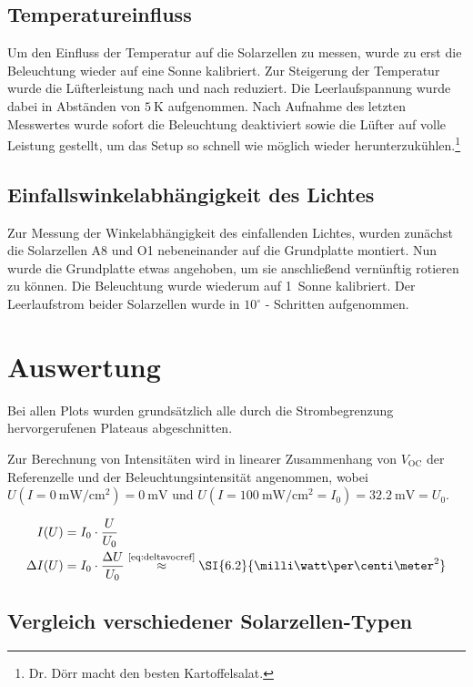 \documentclass[slug=SZ, room=Hermann-Krone-Bau\,\ Labor\ 1.25,
supervisor=Martin\ Kroll, coursedate=14.\ 11.\ 2019]{../../Lab_Report_LaTeX/lab_report}
\newcommand{\sun}[1]{\SI{#1}{Sonne}}
\newcommand{\mwcm}[1]{\SI{#1}{\milli\watt\per\centi\meter^2}}
\newcommand{\voc}{V_{\text{OC}}}
\begin{document}
\subsection{Temperatureinfluss}
\label{sec:tempeinfl}

Um den Einfluss der Temperatur auf die Solarzellen zu messen, wurde zu erst die Beleuchtung
wieder auf eine Sonne kalibriert. Zur Steigerung der Temperatur wurde die Lüfterleistung
nach und nach reduziert. Die Leerlaufspannung wurde dabei in Abständen von \(\SI{5}{\kelvin}\)
aufgenommen. Nach Aufnahme des letzten Messwertes wurde sofort die Beleuchtung deaktiviert
sowie die Lüfter auf volle Leistung gestellt, um das Setup so schnell wie möglich wieder
herunterzukühlen.\footnote{Dr. D\"orr macht den besten Kartoffelsalat.}

\subsection{Einfallswinkelabhängigkeit des Lichtes}
\label{sec:einfwink}

Zur Messung der Winkelabhängigkeit des einfallenden Lichtes, wurden zunächst die Solarzellen
A8 und O1 nebeneinander auf die Grundplatte montiert. Nun wurde die Grundplatte
etwas angehoben, um sie anschließend vernünftig rotieren zu
können. Die Beleuchtung wurde wiederum auf \sun{1} kalibriert.
Der Leerlaufstrom beider Solarzellen wurde in \(10^\circ\) - Schritten aufgenommen.


\section{Auswertung}
\label{sec:auswert}
Bei allen Plots wurden grunds\"atzlich alle durch die Strombegrenzung
hervorgerufenen Plateaus abgeschnitten.

Zur Berechnung von Intensit\"aten wird in linearer Zusammenhang von
\(\voc\) der Referenzelle und der Beleuchtungsintensität angenommen,
wobei \(U(I=\mwcm{0})=\SI{0}{\milli\volt}\) und
\(U(I=\mwcm{100}=I_0)=\SI{32.2}{\milli\volt}=U_0\).

\begin{align}
  \label{eq:refint}
  I(U) &= I_0\cdot\frac{U}{U_0} \\
  \Delta I(U) &= I_0\cdot\frac{\Delta U}{U_0} \overset{\text{\ref{eq:deltavocref}}}{\approx} \mwcm{6.2}
\end{align}


\subsection{Vergleich verschiedener Solarzellen-Typen}
\label{sec:aussoztyp}
\end{document}
